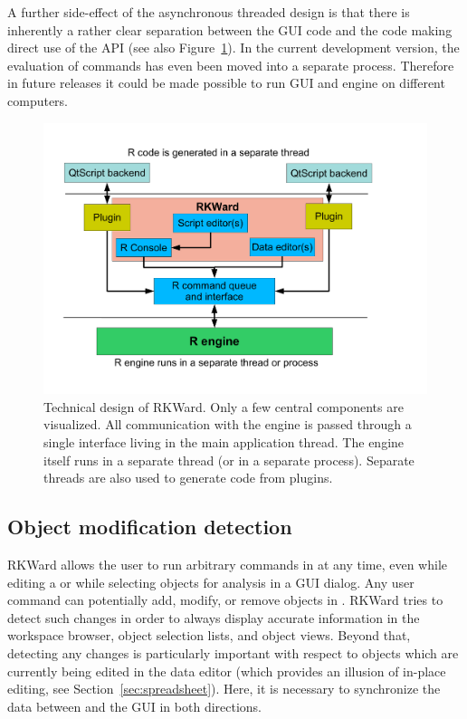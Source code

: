 A further side-effect of the asynchronous threaded design is that there is
inherently a rather clear separation between the GUI code and the code making direct use
of the  API (see also Figure~\ref{fig:design_sketch}). In the current development version, the evaluation
of  commands has even been moved into a separate process. Therefore in future releases it could 
be made possible to run GUI and  engine on different computers.

\begin{figure}[htp]
 \centering
 \includegraphics{../figures/design_sketch.pdf}
 \caption{Technical design of RKWard. Only a few central components are visualized.
 All communication with the  engine is passed through a single interface living in the main application thread. The  engine itself
 runs in a separate thread (or in a separate process). 
 Separate threads are also used to generate  code from plugins.
}
 \label{fig:design_sketch}
\end{figure}

\subsection{Object modification detection}
\label{sec:technical_omd}
RKWard allows the user to run arbitrary commands in  at any time, even while
editing a  or while selecting objects for analysis in a GUI dialog. Any user
command can potentially add, modify, or remove objects in . RKWard tries to
detect such changes in order to always display accurate information in the
workspace browser, object selection lists, and object views. Beyond that,
detecting any changes is particularly important with respect to objects which
are currently being edited in the data editor (which provides an illusion
of in-place editing, see Section~\ref{sec:spreadsheet}). Here, it is necessary to synchronize
the data between  and the GUI in both directions.

